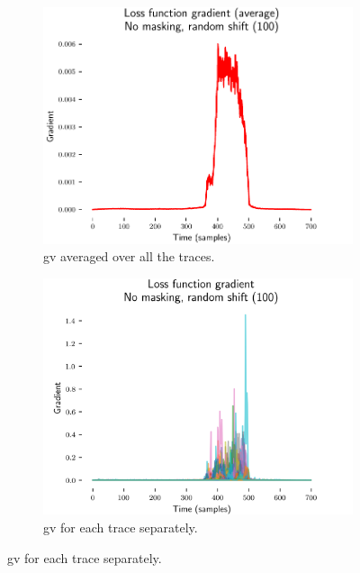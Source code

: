\begin{figure}
    \centering
    \begin{subfigure}[]{0.49 \textwidth}
        \includegraphics[width=\textwidth]{figures/ASCAD_700/no_mask_with_desynchro/grads_avg_n_dense_1_review}
        \caption{\gls{gv} averaged over all the traces.}
        \label{fig:no_mask_with_desynchro_gv_avg}
    \end{subfigure}
	\begin{subfigure}[]{0.49 \textwidth}
        \includegraphics[width=\textwidth]{figures/ASCAD_700/no_mask_with_desynchro/all_grads_review.png}
        \caption{\gls{gv} for each trace separately.}
        \label{fig:no_mask_with_desynchro_gv_single}

\end{subfigure}
\end{figure}
